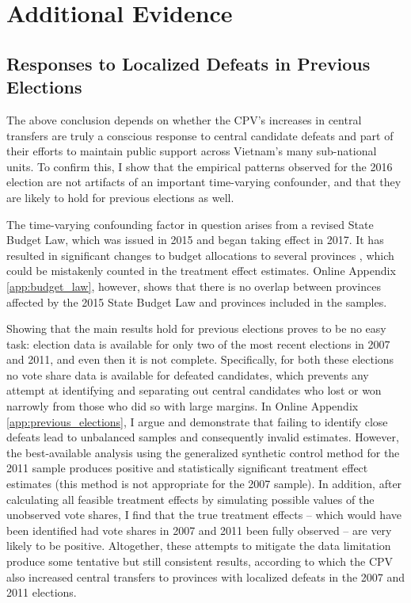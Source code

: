 \documentclass[12pt]{article}
\newcommand{\1}{\mathbbm{1}}
\begin{document}
\section{Additional Evidence}
\label{sec:additional}

\subsection{Responses to Localized Defeats in Previous Elections}

The above conclusion depends on whether the CPV's increases in central transfers are truly a conscious response to central candidate defeats and part of their efforts to maintain public support across Vietnam's many sub-national units. To confirm this, I show that the empirical patterns observed for the 2016 election are not artifacts of an important time-varying confounder, and that they are likely to hold for previous elections as well.

The time-varying confounding factor in question arises from a revised State Budget Law, which was issued in 2015 and began taking effect in 2017. It has resulted in significant changes to budget allocations to several provinces \citep{BaoViet2016}, which could be mistakenly counted in the treatment effect estimates. Online Appendix \ref{app:budget_law}, however, shows that there is no overlap between provinces affected by the 2015 State Budget Law and provinces included in the samples.

Showing that the main results hold for previous elections proves to be no easy task: election data is available for only two of the most recent elections in 2007 and 2011, and even then it is not complete. Specifically, for both these elections no vote share data is available for defeated candidates, which prevents any attempt at identifying and separating out central candidates who lost or won narrowly from those who did so with large margins. In Online Appendix \ref{app:previous_elections}, I argue and demonstrate that failing to identify close defeats lead to unbalanced samples and consequently invalid estimates. However, the best-available analysis using the generalized synthetic control method for the 2011 sample produces positive and statistically significant treatment effect estimates (this method is not appropriate for the 2007 sample). In addition, after calculating all feasible treatment effects by simulating possible values of the unobserved vote shares, I find that the true treatment effects -- which would have been identified had vote shares in 2007 and 2011 been fully observed -- are very likely to be positive. Altogether, these attempts to mitigate the data limitation produce some tentative but still consistent results, according to which the CPV also increased central transfers to provinces with localized defeats in the 2007 and 2011 elections.
\end{document}
